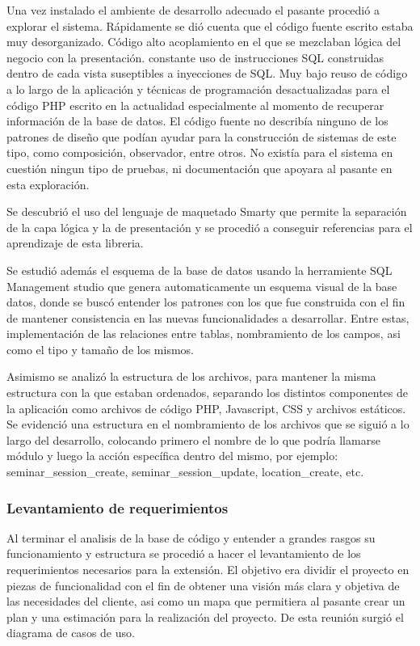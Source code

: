 Una vez instalado el ambiente de desarrollo adecuado el pasante procedió a explorar el sistema. Rápidamente se dió cuenta que el código fuente escrito estaba muy desorganizado. Código alto acoplamiento en el que se mezclaban lógica del negocio con la presentación. constante uso de instrucciones SQL construidas dentro de cada vista suseptibles a inyecciones de SQL. Muy bajo reuso de código a lo largo de la aplicación y técnicas de programación desactualizadas para el código PHP escrito en la actualidad especialmente al momento de recuperar información de la base de datos. El código fuente no describía ninguno de los patrones de diseño que podían ayudar para la construcción de sistemas de este tipo, como composición, observador, entre otros. No existía para el sistema en cuestión ningun tipo de pruebas, ni documentación que apoyara al pasante en esta exploración.

Se descubrió el uso del lenguaje de maquetado Smarty que permite la separación de la capa lógica y la de presentación y se procedió a conseguir referencias para el aprendizaje de esta libreria.

Se estudió además el esquema de la base de datos usando la herramiente SQL Management studio que genera automaticamente un esquema visual de la base datos, donde se buscó entender los patrones con los que fue construida con el fin de mantener consistencia en las nuevas funcionalidades a desarrollar. Entre estas, implementación de las relaciones entre tablas, nombramiento de los campos, asi como el tipo y tamaño de los mismos.

Asimismo se analizó la estructura de los archivos, para mantener la misma estructura con la que estaban ordenados, separando los distintos componentes de la aplicación como archivos de código PHP, Javascript, CSS y archivos estáticos. Se evidenció una estructura en el nombramiento de los archivos que se siguió a lo largo del desarrollo, colocando primero el nombre de lo que podría llamarse módulo y luego la acción específica dentro del mismo, por ejemplo: seminar\_session\_create, seminar\_session\_update, location\_create, etc.

\subsubsection{Levantamiento de requerimientos}

Al terminar el analisis de la base de código y entender a grandes rasgos su funcionamiento y estructura se procedió a hacer el levantamiento de los requerimientos necesarios para la extensión. El objetivo era dividir el proyecto en piezas de funcionalidad con el fin de obtener una visión más clara y objetiva de las necesidades del cliente, asi como un mapa que permitiera al pasante crear un plan y una estimación para la realización del proyecto. De esta reunión surgió el diagrama de casos de uso.

